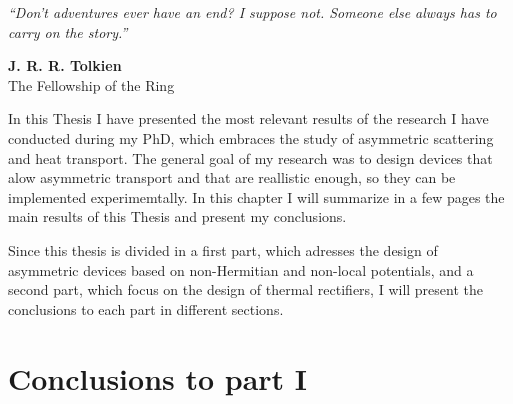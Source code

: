 
\label{Conclusions}
\null
\textit{``Don't adventures ever have an end? I suppose not. Someone else always has to carry on the story.''}
\begin{flushright}
  {\bf J. R. R. Tolkien}\\
  The Fellowship of the Ring
\end{flushright}
\null

In this Thesis I have presented the most relevant results of the research I have conducted during my PhD, which embraces the study of asymmetric scattering and heat transport. The general goal of my research was to design devices that alow asymmetric transport and that are reallistic enough, so they can be implemented experimemtally. In this chapter I will summarize in a few pages the main results of this Thesis and present my conclusions.

Since this thesis is divided in a first part, which adresses the design of asymmetric devices based on non-Hermitian and non-local potentials, and a second part, which focus on the design of thermal rectifiers, I will present the conclusions to each part in different sections.


\section*{Conclusions to part I}

